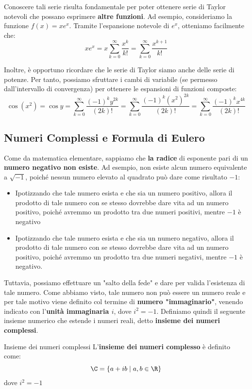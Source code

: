 \documentclass[a4paper, 12pt]{report}
\begin{document}
    Conoscere tali serie risulta fondamentale per poter ottenere serie di Taylor notevoli che possano esprimere \textbf{altre funzioni}. Ad esempio, consideriamo la funzione $f(x) = x e^x$. Tramite l'espansione notevole di $e^x$, otteniamo facilmente che:
    \[x e^x = x \sum_{k=0}^{\infty} \frac{x^k}{k!} = \sum_{k=0}^{\infty} \frac{x^{k+1}}{k!}\]

    Inoltre, è opportuno ricordare che le serie di Taylor siamo anche delle serie di potenze. Per tanto, possiamo sfruttare i cambi di variabile (se permesso dall'intervallo di convergenza) per ottenere le espansioni di funzioni composte:
    \[\cos(x^2) = \cos y = \sum_{k=0}^{\infty} \frac{(-1)^k y^{2k}}{(2k)!} = \sum_{k=0}^{\infty} \frac{(-1)^k (x^2)^{2k}}{(2k)!} = \sum_{k=0}^{\infty} \frac{(-1)^k x^{4k}}{(2k)!}\]
            
    \subsection{Numeri Complessi e Formula di Eulero}
    
    Come da matematica elementare, sappiamo che \textbf{la radice} di esponente pari di un \textbf{numero negativo non esiste}. Ad esempio, non esiste alcun numero equivalente a $\sqrt{-1}$, poiché nessun numero elevato al quadrato può dare come risultato $-1$:
    \begin{itemize}
        \item Ipotizzando che tale numero esista e che sia un numero positivo, allora il prodotto di tale numero con se stesso dovrebbe dare vita ad un numero positivo, poiché avremmo un prodotto tra due numeri positivi, mentre $-1$ è negativo
        \item Ipotizzando che tale numero esista e che sia un numero negativo, allora il prodotto di tale numero con se stesso dovrebbe dare vita ad un numero positivo, poiché avremmo un prodotto tra due numeri negativi, mentre $-1$ è negativo.
    \end{itemize}
        
    Tuttavia, possiamo effettuare un "salto della fede" e dare per valida l'esistenza di tale numero. Come abbiamo visto, tale numero non può essere un numero reale e per tale motivo viene definito col termine di \textbf{numero "immaginario"}, venendo indicato con l'\textbf{unità immaginaria $i$}, dove $i^2 = -1$. Definiamo quindi il seguente insieme numerico che estende i numeri reali, detto \textbf{insieme dei numeri complessi}.

    \begin{frameddefn}{Insieme dei numeri complessi}
        L'\textbf{insieme dei numeri complesso} è definito come:
        \[\C = \{a+ib \mid a,b \in \R\}\]
        dove $i^2 = -1$
    \end{frameddefn}
\end{document}
